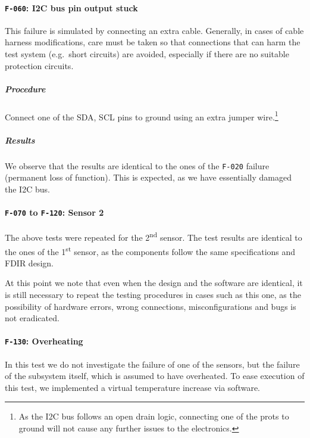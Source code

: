 \documentclass[a4paper,nobib,final]{tufte-book}
\begin{document}
\FloatBarrier
\paragraph{\textbf{\texttt{F-060}: \acs{I2C} bus pin output stuck}}\hspace{0pt}

This failure is simulated by connecting an extra cable. Generally, in cases of cable harness modifications, care must be taken so that connections that can harm the test system (e.g.\ short circuits) are avoided, especially if there are no suitable protection circuits.

\subparagraph{Procedure}
\begin{compactenum}
	\item Connect one of the \acs{SDA}, \acs{SCL} pins to ground using an extra jumper wire.\footnote{As the \acs{I2C} bus follows an open drain logic, connecting one of the prots to ground will not cause any further issues to the electronics.}
\end{compactenum}

\subparagraph{Results}
We observe that the results are identical to the ones of the \texttt{F-020} failure (permanent loss of function). This is expected, as we have essentially damaged the \acs{I2C} bus.

\paragraph{\textbf{\texttt{F-070} to \texttt{F-120}: Sensor 2}}\hspace{0pt}

The above tests were repeated for the 2\textsuperscript{nd} sensor. The test results are identical to the ones of the 1\textsuperscript{st} sensor, as the components follow the same specifications and \acs{FDIR} design.

At this point we note that even when the design and the software are identical, it is still necessary to repeat the testing procedures in cases such as this one, as the possibility of hardware errors, wrong connections, misconfigurations and bugs is not eradicated.

\clearpage
\paragraph{\textbf{\texttt{F-130}: Overheating}}\hspace{0pt}

In this test we do not investigate the failure of one of the sensors, but the failure of the subsystem itself, which is assumed to have overheated. To ease execution of this test, we implemented a virtual temperature increase via software.
\end{document}
